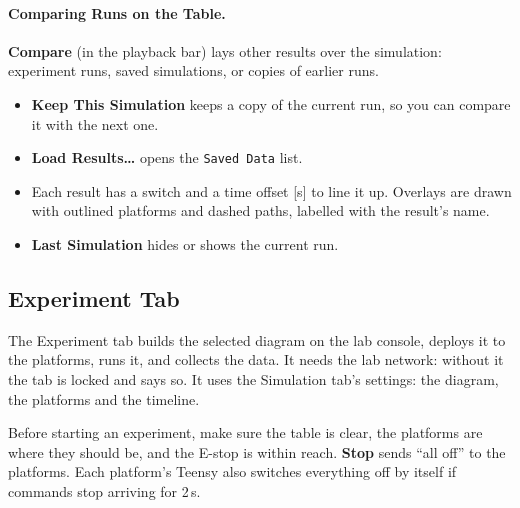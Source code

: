 \documentclass[11pt,a4paper]{article}
\newcommand{\ui}[1]{\textsf{\textbf{#1}}}
\newcommand{\pth}[1]{\texttt{#1}}
\begin{document}
\paragraph{Comparing Runs on the Table.}
\ui{Compare} (in the playback bar) lays other results over the simulation: experiment runs, saved simulations, or
copies of earlier runs.
\begin{itemize}
  \item \ui{Keep This Simulation} keeps a copy of the current run, so you can compare it with the next one.
  \item \ui{Load Results\ldots} opens the \pth{Saved Data} list.
  \item Each result has a switch and a time offset [s] to line it up. Overlays are drawn with outlined platforms
        and dashed paths, labelled with the result's name.
  \item \ui{Last Simulation} hides or shows the current run.
\end{itemize}

\subsection{Experiment Tab}
The Experiment tab builds the selected diagram on the lab console, deploys it to the platforms, runs it, and collects
the data. It needs the lab network: without it the tab is locked and says so.
It uses the Simulation tab's settings: the diagram, the platforms and the timeline.

\begin{warnbox}
Before starting an experiment, make sure the table is clear, the platforms are where they should be, and the
E-stop is within reach. \ui{Stop} sends ``all off'' to the platforms. Each platform's Teensy also switches
everything off by itself if commands stop arriving for 2\,s.
\end{warnbox}
\end{document}
